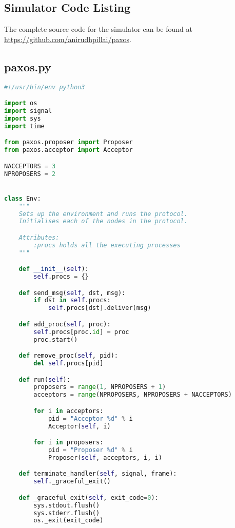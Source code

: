 \begin{landscape}

\chapter{Simulator Code Listing}

The complete source code for the simulator can be found at
\href{https://github.com/anirudhpillai/paxos}{https://github.com/anirudhpillai/paxos}.

\section{paxos.py}
\begin{multicols*}{2}
\begin{lstlisting}[style=SourceCodeListing,language=Python]
#!/usr/bin/env python3

import os
import signal
import sys
import time

from paxos.proposer import Proposer
from paxos.acceptor import Acceptor

NACCEPTORS = 3
NPROPOSERS = 2


class Env:
    """
    Sets up the environment and runs the protocol.
    Initialises each of the nodes in the protocol.

    Attributes:
        :procs holds all the executing processes
    """

    def __init__(self):
        self.procs = {}

    def send_msg(self, dst, msg):
        if dst in self.procs:
            self.procs[dst].deliver(msg)

    def add_proc(self, proc):
        self.procs[proc.id] = proc
        proc.start()

    def remove_proc(self, pid):
        del self.procs[pid]

    def run(self):
        proposers = range(1, NPROPOSERS + 1)
        acceptors = range(NPROPOSERS, NPROPOSERS + NACCEPTORS)

        for i in acceptors:
            pid = "Acceptor %d" % i
            Acceptor(self, i)

        for i in proposers:
            pid = "Proposer %d" % i
            Proposer(self, acceptors, i, i)

    def terminate_handler(self, signal, frame):
        self._graceful_exit()

    def _graceful_exit(self, exit_code=0):
        sys.stdout.flush()
        sys.stderr.flush()
        os._exit(exit_code)



\end{lstlisting}
\end{multicols*}
\end{landscape}
